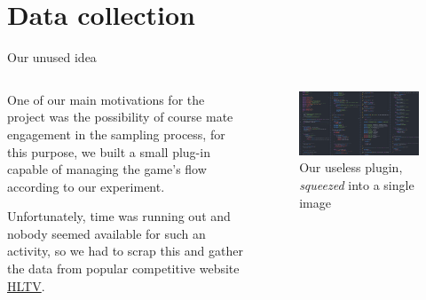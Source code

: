 \documentclass[english]{beamer}
\begin{document}
\section{Data collection}
\begin{frame}{Our unused idea}
  \begin{columns}
    \begin{column}{0.55\textwidth}
      One of our main motivations for the project was the possibility of course mate engagement in the sampling process, for this purpose, we built a small plug-in capable of managing 
      the game's flow according to our experiment.
      
      Unfortunately, time was running out and nobody seemed available for such an activity, so we had to scrap this and gather the data 
      from popular competitive website \href{https://www.hltv.org/}{HLTV}.
    \end{column}
    \begin{column}{0.45\textwidth}
      \begin{figure}
        \centering
        \includegraphics[width=1\textwidth]{images/plugin_code.png}
        \caption{Our useless plugin, \emph{squeezed} into a single image}
        \end{figure}
    \end{column}
  \end{columns}
\end{frame}
\end{document}
